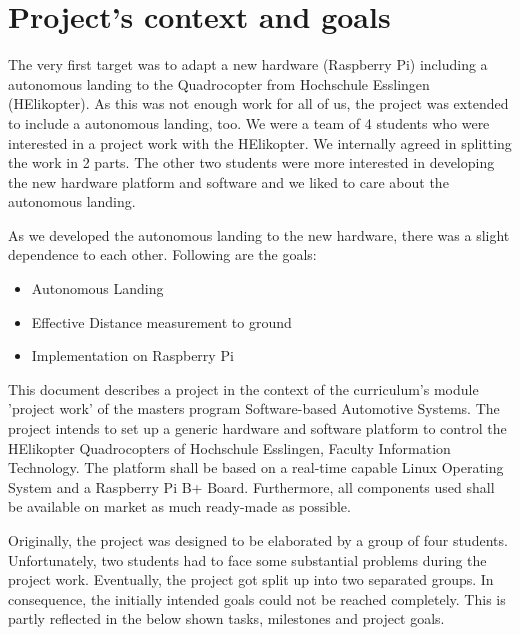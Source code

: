 \chapter{Project's context and goals}
\label{sec:projGoals}

The very first target was to adapt a new hardware (Raspberry Pi) including a autonomous landing to the Quadrocopter from Hochschule Esslingen (HElikopter). As this was not enough work for all of us, the project was extended to include a autonomous landing, too. We were a team of 4 students who were interested in a project work with the HElikopter. We internally agreed in splitting the work in 2 parts. The other two students were more interested in developing the new hardware platform and software and we liked to care about the autonomous landing.

As we developed the autonomous landing to the new hardware, there was a slight dependence to each other.
Following are the goals:
\begin{itemize}
	\item Autonomous Landing
	\item Effective Distance measurement to ground
	\item Implementation on Raspberry Pi
\end{itemize}

This document describes a project in the context of the curriculum's module 'project work' of the masters program Software-based Automotive Systems. The project intends to set up a generic hardware and software platform to control the HElikopter Quadrocopters of Hochschule Esslingen, Faculty Information Technology. The platform shall be based on a real-time capable Linux Operating System and a Raspberry Pi B+ Board. Furthermore, all components used shall be available on market as much ready-made as possible.

Originally, the project was designed to be elaborated by a group of four students. Unfortunately, two students had to face some substantial problems during the project work. Eventually, the project got split up into two separated groups. In consequence, the initially intended goals could not be reached completely. This is partly reflected in the below shown tasks, milestones and project goals.

